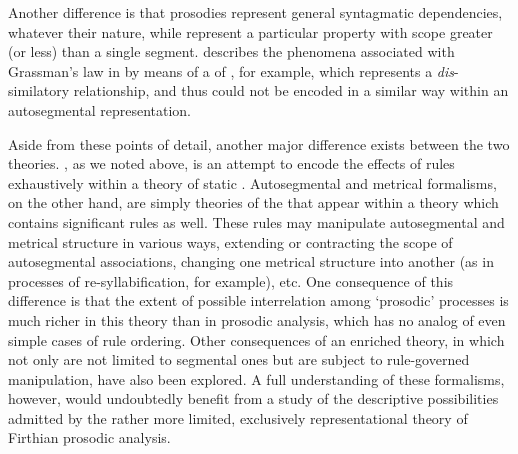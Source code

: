 Another difference is that prosodies represent general syntagmatic
dependencies, whatever their nature, while  represent a
particular property with scope greater (or less) than a single
segment. \citet{allen51:sanskrit} describes the phenomena associated
with Grassman's law in  by means of a  of ,
for example, which represents a \emph{dis}-similatory relationship,
and thus could not be encoded in a similar way within an autosegmental
representation.

Aside from these points of detail, another major difference exists
between the two theories. , as we noted above, is an
attempt to encode the effects of rules exhaustively within a theory of
static . Autosegmental and metrical formalisms, on the
other hand, are simply theories of the  that appear
within a theory which contains significant rules as well. These rules
may manipulate autosegmental and metrical structure in various ways,
extending or contracting the scope of autosegmental associations,
changing one metrical structure into another (as in processes of
re-syllabification, for example), etc. One consequence of this
difference is that the extent of possible interrelation among
`prosodic' processes is much richer in this theory than in prosodic
analysis, which has no analog of even simple cases of rule
ordering. Other consequences of an enriched theory, in which
 not only are not limited to segmental ones but are
subject to rule-governed manipulation, have also been explored. A full
understanding of these formalisms, however, would undoubtedly benefit
from a study of the descriptive possibilities admitted by the rather
more limited, exclusively representational theory of Firthian prosodic
analysis.


